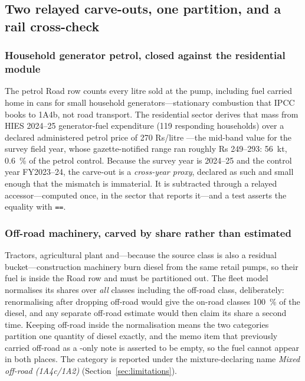 \subsection{Two relayed carve-outs, one partition, and a rail cross-check}

\subsubsection{Household generator petrol, closed against the residential module}

The petrol Road row counts every litre sold at the pump, including fuel carried home in
cans for small household generators---stationary combustion that IPCC books to 1A4b, not
road transport. The residential sector derives that mass from HIES 2024--25 generator-fuel
expenditure \citep{hies2025} (119 responding households) over a declared administered
petrol price of \SI{270}{} Rs/litre \citep{goppetrol}---the mid-band value for the survey
field year, whose gazette-notified range ran roughly Rs 249--293: \SI{56}{\kilo\tonne},
\SI{0.6}{\percent} of the petrol control. Because the survey year is 2024--25 and the
control year FY2023--24, the carve-out is a \emph{cross-year proxy}, declared as such and
small enough that the mismatch is immaterial. It is subtracted through a relayed
accessor---computed once, in the sector that reports it---and a test asserts the equality
with \texttt{==}.

\subsubsection{Off-road machinery, carved by share rather than estimated}

Tractors, agricultural plant and---because the source class is also a residual
bucket---construction machinery burn diesel from the same retail pumps, so their fuel is
inside the Road row and must be partitioned out. The fleet model normalises its shares
over \emph{all} classes including the off-road class, deliberately: renormalising after
dropping off-road would give the on-road classes \SI{100}{\percent} of the diesel, and any
separate off-road estimate would then claim its share a second time. Keeping off-road
inside the normalisation means the two categories partition one quantity of diesel
exactly, and the memo item that previously carried off-road as a \COtwo{}-only note is
asserted to be empty, so the fuel cannot appear in both places. The category is reported
under the mixture-declaring name \emph{Mixed off-road (1A4c/1A2)}
(Section~\ref{sec:limitations}).

